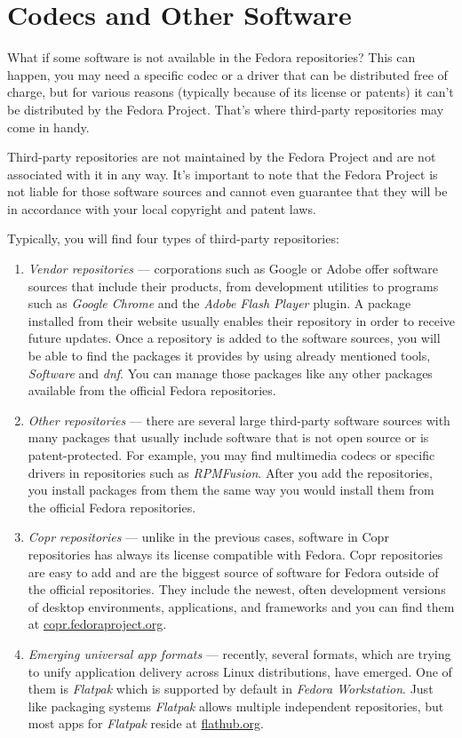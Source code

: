\section*{Codecs and Other Software}

What if some software is not available in the Fedora repositories? This can happen, you may need a specific codec or a driver that can be distributed free of charge, but for various reasons (typically because of its license or patents) it can't be distributed by the Fedora Project. That's where third-party repositories may come in handy.

Third-party repositories are not maintained by the Fedora Project and are not associated with it in any way. It's important to note that the Fedora Project is not liable for those software sources and cannot even guarantee that they will be in accordance with your local copyright and patent laws.

Typically, you will find four types of third-party repositories:
\begin{enumerate}
\item\emph{Vendor repositories} --- corporations such as Google or Adobe offer software sources that include their products, from development utilities to programs such as \emph{Google Chrome} and the \emph{Adobe Flash Player} plugin. A package installed from their website usually enables their repository in order to receive future updates. Once a repository is added to the software sources, you will be able to find the packages it provides by using already mentioned tools, \emph{Software} and \emph{dnf}. You can manage those packages like any other packages available from the official Fedora repositories.

\item\emph{Other repositories} --- there are several large third-party software sources with many packages that usually include software that is not open source or is patent-protected. For example, you may find multimedia codecs or specific drivers in repositories such as \emph{RPMFusion}. After you add the repositories, you install packages from them the same way you would install them from the official Fedora repositories.

\item\emph{Copr repositories} --- unlike in the previous cases, software in Copr repositories has always its license compatible with Fedora. Copr repositories are easy to add and are the biggest source of software for Fedora outside of the official repositories. They include the newest, often development versions of desktop environments, applications, and frameworks and you can find them at \url{copr.fedoraproject.org}.

\item\emph{Emerging universal app formats} --- recently, several formats, which are trying to unify application delivery across Linux distributions, have emerged. One of them is \emph{Flatpak} which is supported by default in \emph{Fedora Workstation}. Just like packaging systems \emph{Flatpak} allows multiple independent repositories, but most apps for \emph{Flatpak} reside at \url{flathub.org}.
\end{enumerate}

